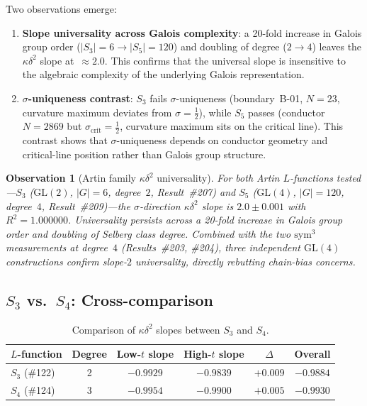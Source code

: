 \documentclass[11pt, a4paper]{article}
\theoremstyle{plain}
\newtheorem{observation}[theorem]{Observation}
\theoremstyle{definition}
\newcommand{\kap}{\kappa}             %
\begin{document}
Two observations emerge:
\begin{enumerate}
  \item \textbf{Slope universality across Galois complexity}: a 20-fold
    increase in Galois group order ($|S_{3}|=6 \to |S_{5}|=120$) and
    doubling of degree ($2\to 4$) leaves the $\kap\delta^{2}$ slope
    at~$\approx 2.0$.  This confirms that the universal slope is
    insensitive to the algebraic complexity of the underlying Galois
    representation.
  \item \textbf{$\sigma$-uniqueness contrast}: $S_{3}$ fails
    $\sigma$-uniqueness (boundary~B-01, $N=23$, curvature maximum
    deviates from $\sigma=\tfrac{1}{2}$), while $S_{5}$ passes
    (conductor $N=2869$ but $\sigma_{\mathrm{crit}}=\tfrac{1}{2}$,
    curvature maximum sits on the critical line).  This contrast
    shows that $\sigma$-uniqueness depends on conductor geometry
    and critical-line position rather than Galois group structure.
\end{enumerate}

\begin{observation}[Artin family $\kap\delta^{2}$ universality]
\label{obs:artin_universal}
For both Artin $L$-functions tested---$S_{3}$ ($\mathrm{GL}(2)$,
$|G|=6$, degree~$2$, Result~\#207) and $S_{5}$ ($\mathrm{GL}(4)$,
$|G|=120$, degree~$4$, Result~\#209)---the $\sigma$-direction
$\kap\delta^{2}$ slope is $2.0\pm 0.001$ with $R^{2}=1.000000$.
Universality persists across a 20-fold increase in Galois group
order and doubling of Selberg class degree.
Combined with the two $\mathrm{sym}^{3}$ measurements at degree~$4$
(Results~\#203, \#204), three independent $\mathrm{GL}(4)$
constructions confirm slope-$2$ universality, directly rebutting
chain-bias concerns.
\end{observation}


\subsection{$S_{3}$ vs.\ $S_{4}$: Cross-comparison}
\label{sec:artin-compare}

\begin{table}[ht]
\centering
\caption{Comparison of $\kap\delta^{2}$ slopes between $S_{3}$ and $S_{4}$.}
\label{tab:artin-compare}
\begin{tabular}{@{}lccccc@{}}
\toprule
$L$-\textbf{function} & \textbf{Degree} & \textbf{Low-$t$ slope}
  & \textbf{High-$t$ slope} & \textbf{$\Delta$} & \textbf{Overall} \\
\midrule
$S_{3}$ (\#122) & 2 & $-0.9929$ & $-0.9839$ & $+0.009$ & $-0.9884$ \\
$S_{4}$ (\#124) & 3 & $-0.9954$ & $-0.9900$ & $+0.005$ & $-0.9930$ \\
\bottomrule
\end{tabular}
\end{table}
\end{document}
